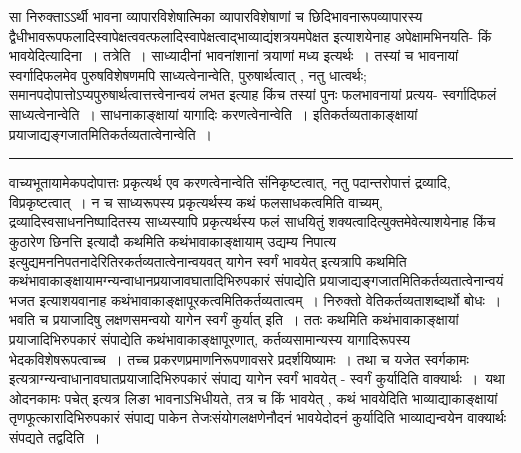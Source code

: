 \documentclass[11pt, openany]{book}
\begin{document}
 सा निरुक्ताऽऽर्थी भावना व्यापारविशेषात्मिका व्यापारविशेषाणां च छिदिभावनारूपव्यापारस्य द्वैधीभावरूपफलादिस्वापेक्षत्ववत्फलादिस्वापेक्षत्वाद्भाव्याद्यंशत्रयमपेक्षत
इत्याशयेनाह  अपेक्षामभिनयति- {\br किं भावयेदित्यादिना~। तत्रेति~।} साध्यादीनां भावनांशानां त्रयाणां मध्य इत्यर्थः~। तस्यां च भावनायां स्वर्गादिफलमेव पुरुषविशेषणमपि साध्यत्वेनान्वेति, पुरुषार्थत्वात् , नतु धात्वर्थः; समानपदोपात्तोऽप्यपुरुषार्थत्वात्तत्त्वेनान्वयं लभत इत्याह किंच तस्यां पुनः फलभावनायां प्रत्यय-
\newpage
\fancyhead[RE]{[ आर्थीभावनाया }
{\bl\noindent स्वर्गादिफलं साध्यत्वेनान्वेति~। साधनाकाङ्क्षायां यागादिः करणत्वेनान्वेति~। इतिकर्तव्यताकाङ्क्षायां प्रयाजाद्यङ्गजातमितिकर्तव्यतात्वेनान्वेति~।}\\
\hrule
\vspace{3mm}
\noindent
वाच्यभूतायामेकपदोपात्तः प्रकृत्यर्थ एव करणत्वेनान्वेति संनिकृष्टत्वात्, नतु पदान्तरोपात्तं द्रव्यादि, विप्रकृष्टत्वात्~। न च साध्यरूपस्य प्रकृत्यर्थस्य कथं फलसाधकत्वमिति वाच्यम्, द्रव्यादिस्वसाधननिष्पादितस्य साध्यस्यापि प्रकृत्यर्थस्य फलं साधयितुं शक्यत्वादित्युक्तमेवेत्याशयेनाह किंच {\qt कुठारेण छिनत्ति} इत्यादौ कथमिति कथंभावाकाङ्क्षायाम् {\qt उद्यम्य निपात्य} इत्युद्यमननिपतनादेरितिरकर्तव्यतात्वेनान्वयवत् {\qt यागेन स्वर्गं भावयेत्} इत्यत्रापि कथमिति कथंभावाकाङ्क्षायामग्न्यन्वाधानप्रयाजावघातादिभिरुपकारं संपाद्येति प्रयाजाद्यङ्गजातमितिकर्तव्यतात्वेनान्वयं भजत इत्याशयवानाह कथंभावाकाङ्क्षापूरकत्वमितिकर्तव्यतात्वम्~। निरुक्तो वेतिकर्तव्यताशब्दार्थो बोधः~। भवति च प्रयाजादिषु लक्षणसमन्वयो {\qt यागेन
स्वर्गं कुर्यात्} इति~। ततः कथमिति कथंभावाकाङ्क्षायां प्रयाजादिभिरुपकारं संपाद्येति कथंभावाकाङ्क्षापूरणात्, कर्तव्यसामान्यस्य यागादिरूपस्य भेदकविशेषरूपत्वाच्च~। तच्च प्रकरणप्रमाणनिरूपणावसरे प्रदर्शयिष्यामः~। तथा च {\qt यजेत स्वर्गकामः} इत्यत्राग्न्यन्वाधानावघातप्रयाजादिभिरुपकारं संपाद्य यागेन स्वर्गं भावयेत् - स्वर्गं कुर्यादिति वाक्यार्थः~।~यथा {\qt ओदनकामः पचेत्} इत्यत्र लिङा भावनाऽभिधीयते, तत्र च किं भावयेत् , कथं भावयेदिति भाव्याद्याकाङ्क्षायां तृणफूत्कारादिभिरुपकारं संपाद्य पाकेन
तेजःसंयोगलक्षणेनौदनं भावयेदोदनं कुर्यादिति भाव्याद्यन्वयेन वाक्यार्थः संपद्यते तद्वदिति~।~\\
\end{document}
